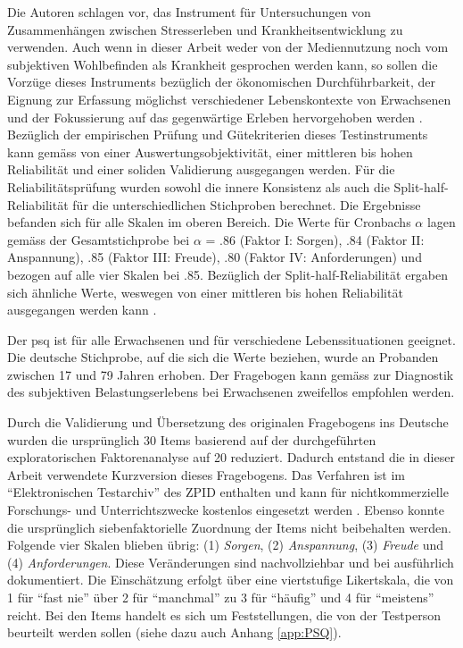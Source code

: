 Die Autoren  schlagen vor, das Instrument für Untersuchungen von Zusammenhängen zwischen Stresserleben und Krankheitsentwicklung zu verwenden. Auch wenn in dieser Arbeit weder von der Mediennutzung noch vom subjektiven Wohlbefinden als Krankheit gesprochen werden kann, so sollen die Vorzüge dieses Instruments bezüglich der ökonomischen Durchführbarkeit, der Eignung zur Erfassung möglichst verschiedener Lebenskontexte von Erwachsenen und der Fokussierung auf das gegenwärtige Erleben hervorgehoben werden \cite{Fliege2001}. Bezüglich der empirischen Prüfung und Gütekriterien dieses Testinstruments kann gemäss  von einer Auswertungsobjektivität, einer mittleren bis hohen Reliabilität und einer soliden Validierung ausgegangen werden. 
Für die Reliabilitätsprüfung wurden sowohl die innere Konsistenz als auch die Split-half-Reliabilität für die unterschiedlichen Stichproben berechnet. Die Ergebnisse befanden sich für alle Skalen im oberen Bereich. Die Werte für Cronbachs $\alpha$ lagen gemäss der Gesamtstichprobe bei $\alpha$ = .86 (Faktor I: Sorgen), .84 (Faktor II: Anspannung), .85 (Faktor III: Freude), .80 (Faktor IV: Anforderungen) und bezogen auf alle vier Skalen bei .85. Bezüglich der Split-half-Reliabilität ergaben sich ähnliche Werte, weswegen von einer mittleren bis hohen Reliabilität ausgegangen werden kann \cite{Fliege2001}.

Der \acrshort{psq} \cite{Fliege2001} ist für alle Erwachsenen und für verschiedene Lebenssituationen geeignet. Die deutsche Stichprobe, auf die sich die Werte beziehen, wurde an Probanden zwischen 17 und 79 Jahren erhoben. Der Fragebogen kann gemäss  zur Diagnostik des subjektiven Belastungserlebens bei Erwachsenen zweifellos empfohlen werden.

Durch die Validierung und Übersetzung des originalen Fragebogens ins Deutsche wurden die ursprünglich 30 Items basierend auf der durchgeführten exploratorischen Faktorenanalyse auf 20 reduziert. Dadurch entstand die in dieser Arbeit verwendete Kurzversion dieses Fragebogens. Das Verfahren ist im \enquote{Elektronischen Testarchiv} des ZPID enthalten und kann für nichtkommerzielle Forschungs- und Unterrichtszwecke kostenlos eingesetzt werden \cite{ZPID}. Ebenso konnte die ursprünglich siebenfaktorielle Zuordnung der Items nicht beibehalten werden. Folgende vier Skalen blieben übrig: (1) \textit{Sorgen}, (2) \textit{Anspannung}, (3) \textit{Freude} und (4) \textit{Anforderungen}. Diese Veränderungen sind nachvollziehbar und bei  ausführlich dokumentiert. Die Einschätzung erfolgt über eine viertstufige Likert\-skala, die von 1 für \enquote{fast nie} über 2 für \enquote{manchmal} zu 3 für \enquote{häufig} und 4 für \enquote{meistens} reicht. Bei den Items handelt es sich um Feststellungen, die von der Testperson beurteilt werden sollen (siehe dazu auch Anhang \ref{app:PSQ}). 

